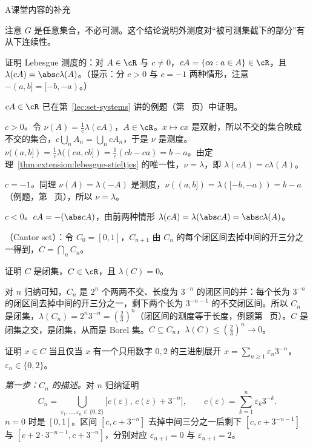 \begin{exercises}{A}{课堂内容的补充}
\begin{questions}
\begin{solution}
注意 $G$ 是任意集合，不必可测。这个结论说明外测度对“被可测集截下的部分”有从下连续性。
\end{solution}
\end{questions}

\item\label{ex:extension:A3} 证明 Lebesgue 测度的：对 $A\in\cR$ 与 $c\neq0$，$cA=\{ca:a\in A\}\in\cR$，且 $\lambda(cA)=\abs c\lambda(A)$。（提示：分 $c>0$ 与 $c=-1$ 两种情形，注意 $-(a,b]=[-b,-a)$。）
\begin{solution}
$cA\in\cR$ 已在第~\ref{lec:set-systems} 讲的例题（第~\pageref{we:set-systems:translation} 页）中证明。

\emph{$c>0$。}令 $\nu(A)=\frac1c\lambda(cA)$，$A\in\cR$。$x\mapsto cx$ 是双射，所以不交的集合映成不交的集合，$c\bigcup_nA_n=\bigcup_n cA_n$，于是 $\nu$ 是测度。$\nu((a,b])=\frac1c\lambda((ca,cb])=\frac1c(cb-ca)=b-a$。由定理~\ref{thm:extension:lebesgue-stieltjes} 的唯一性，$\nu=\lambda$，即 $\lambda(cA)=c\lambda(A)$。

\emph{$c=-1$。}同理 $\nu(A)=\lambda(-A)$ 是测度，$\nu((a,b])=\lambda([-b,-a))=b-a$（例题，第~\pageref{we:extension:atoms} 页），所以 $\nu=\lambda$。

\emph{$c<0$。}$cA=-(\abs cA)$，由前两种情形 $\lambda(cA)=\lambda(\abs cA)=\abs c\lambda(A)$。
\end{solution}

\item\label{ex:extension:A4} （Cantor set）：令 $C_0=[0,1]$，$C_{n+1}$ 由 $C_n$ 的每个闭区间去掉中间的开三分之一得到，$C=\bigcap_nC_n$。
\begin{questions}
\item 证明 $C$ 是闭集，$C\in\cR$，且 $\lambda(C)=0$。
\begin{solution}
对 $n$ 归纳可知，$C_n$ 是 $2^n$ 个两两不交、长度为 $3^{-n}$ 的闭区间的并：每个长为 $3^{-n}$ 的闭区间去掉中间的开三分之一，剩下两个长为 $3^{-n-1}$ 的不交闭区间。所以 $C_n$ 是闭集，$\lambda(C_n)=2^n3^{-n}=(\frac23)^n$（闭区间的测度等于长度，例题第~\pageref{we:extension:atoms} 页）。$C$ 是闭集之交，是闭集，从而是 Borel 集。$C\subseteq C_n$，$\lambda(C)\leqslant(\frac23)^n\to0$。
\end{solution}
\item 证明 $x\in C$ 当且仅当 $x$ 有一个只用数字 $0,2$ 的三进制展开 $x=\sum_{n\geqslant1}\varepsilon_n3^{-n}$，$\varepsilon_n\in\{0,2\}$。
\begin{solution}
\emph{第一步：$C_n$ 的描述。}对 $n$ 归纳证明
\[
C_n=\bigcup_{\varepsilon_1,\dots,\varepsilon_n\in\{0,2\}}\bigl[c(\varepsilon),\,c(\varepsilon)+3^{-n}\bigr],\qquad c(\varepsilon)=\sum_{k=1}^n\varepsilon_k3^{-k}.
\]
$n=0$ 时是 $[0,1]$。区间 $[c,c+3^{-n}]$ 去掉中间三分之一后剩下 $[c,c+3^{-n-1}]$ 与 $[c+2\cdot3^{-n-1},c+3^{-n}]$，分别对应 $\varepsilon_{n+1}=0$ 与 $\varepsilon_{n+1}=2$。


\end{solution}
\end{questions}
\end{exercises}
